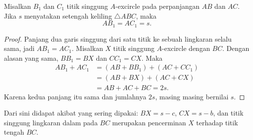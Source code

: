 \documentclass[letterpaper, 13pt]{scrartcl}
\newcommand{\titik}[1]{\foreach \p in {#1} \filldraw (\p) circle (1.4pt);}
\begin{document}
\noindent
\begin{minipage}[t]{175pt}
\vspace{0pt}
\centering
{}
\end{minipage}\hfill
\begin{minipage}[t]{\dimexpr\textwidth-175pt-16pt\relax}
\vspace{0pt}
\begin{lemma*}
Misalkan $B_1$ dan $C_1$ titik singgung $A$-excircle pada perpanjangan $AB$ dan $AC$. Jika $s$ menyatakan setengah keliling $\triangle ABC$, maka
\[
AB_1 = AC_1 = s.
\]
\end{lemma*}
\end{minipage}
\par\bigskip


\begin{proof}
Panjang dua garis singgung dari satu titik ke sebuah lingkaran selalu sama, jadi $AB_1 = AC_1$. Misalkan $X$ titik singgung $A$-excircle dengan $BC$. Dengan alasan yang sama, $BB_1 = BX$ dan $CC_1 = CX$. Maka
\begin{align*}
  AB_1 + AC_1 &= (AB + BB_1) + (AC + CC_1) \\
              &= (AB + BX) + (AC + CX) \\
              &= AB + AC + BC = 2s.
\end{align*}
Karena kedua panjang itu sama dan jumlahnya $2s$, masing masing bernilai $s$.
\end{proof}

Dari sini didapat akibat yang sering dipakai: $BX = s - c$, $CX = s - b$, dan titik singgung lingkaran dalam pada $BC$ merupakan pencerminan $X$ terhadap titik tengah $BC$.
\end{document}
